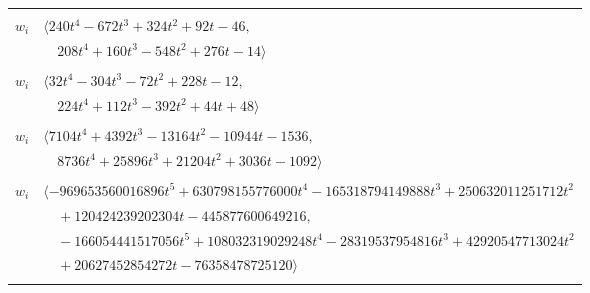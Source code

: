 \documentclass[11pt]{article}
\begin{document}
\begin{longtable}{@{}ll@{}}
\addlinespace[2pt]
\multicolumn{2}{@{}p{0.97\textwidth}@{}}{$i=29$, $D_i=1$, $\rho_{ij}$: $1{:}2, \allowbreak 5{:}2, \allowbreak 17{:}2, \allowbreak 19{:}2, \allowbreak 26{:}2, \allowbreak 30{:}2, \allowbreak 43{:}2, \allowbreak 45{:}2, \allowbreak 69{:}2$}\\
$w_i$ & $\langle 240t^{4}-672t^{3}+324t^{2}+92t-46,$\\
 & $\quad 208t^{4}+160t^{3}-548t^{2}+276t-14\rangle$\\
\addlinespace[2pt]
\multicolumn{2}{@{}p{0.97\textwidth}@{}}{$i=30$, $D_i=2$, $e_i=1$, $\rho_{ij}$: $13{:}2, \allowbreak 29{:}2, \allowbreak 31{:}2, \allowbreak 35{:}2, \allowbreak 49{:}2, \allowbreak 53{:}1, \allowbreak 64{:}3, \allowbreak 67{:}1$}\\
$w_i$ & $\langle 32t^{4}-304t^{3}-72t^{2}+228t-12,$\\
 & $\quad 224t^{4}+112t^{3}-392t^{2}+44t+48\rangle$\\
\addlinespace[2pt]
\multicolumn{2}{@{}p{0.97\textwidth}@{}}{$i=31$, $D_i=4$, $\rho_{ij}$: $0{:}1, \allowbreak 11{:}3, \allowbreak 12{:}1, \allowbreak 15{:}3, \allowbreak 20{:}3, \allowbreak 23{:}3, \allowbreak 30{:}2, \allowbreak 44{:}2, \allowbreak 45{:}1, \allowbreak 53{:}1, \allowbreak 54{:}3, \allowbreak 63{:}3, \allowbreak 64{:}3, \allowbreak 72{:}1, \allowbreak 73{:}2$}\\
$w_i$ & $\langle 7104t^{4}+4392t^{3}-13164t^{2}-10944t-1536,$\\
 & $\quad 8736t^{4}+25896t^{3}+21204t^{2}+3036t-1092\rangle$\\
\addlinespace[2pt]
\multicolumn{2}{@{}p{0.97\textwidth}@{}}{$i=32$, $D_i=524288$, $e_i=3$, $\rho_{ij}$: $1{:}2, \allowbreak 2{:}3, \allowbreak 8{:}1, \allowbreak 9{:}3, \allowbreak 12{:}3, \allowbreak 14{:}3, \allowbreak 34{:}2, \allowbreak 35{:}2, \allowbreak 38{:}3, \allowbreak 51{:}2, \allowbreak 58{:}3, \allowbreak 59{:}3, \allowbreak 64{:}1, \allowbreak 66{:}3, \allowbreak 67{:}3, \allowbreak 77{:}2$}\\
$w_i$ & $\langle -969653560016896t^{5}+630798155776000t^{4}-165318794149888t^{3}+250632011251712t^{2}$\\
 & $\quad +120424239202304t-445877600649216,$\\
 & $\quad -166054441517056t^{5}+108032319029248t^{4}-28319537954816t^{3}+42920547713024t^{2}$\\
 & $\quad +20627452854272t-76358478725120\rangle$\\
\addlinespace[2pt]
\multicolumn{2}{@{}p{0.97\textwidth}@{}}{$i=33$, $D_i=2$, $e_i=3$, $\rho_{ij}$: $4{:}2, \allowbreak 17{:}2, \allowbreak 18{:}1, \allowbreak 20{:}2, \allowbreak 27{:}2, \allowbreak 40{:}1, \allowbreak 58{:}3, \allowbreak 66{:}1, \allowbreak 67{:}1$}\\

\end{longtable}
\end{document}
